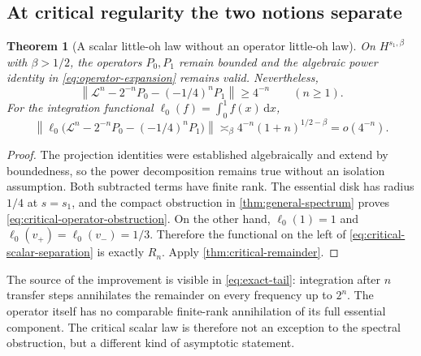 \documentclass[11pt,a4paper]{article}
\newtheorem{theorem}{Theorem}[section]
\theoremstyle{definition}
\theoremstyle{remark}
\newcommand{\dd}{\,\mathrm d}
\newcommand{\Lop}{\mathcal L}
\newcommand{\norm}[1]{\left\lVert#1\right\rVert}
\numberwithin{equation}{section}
\begin{document}
\subsection{At critical regularity the two notions separate}
\begin{theorem}[A scalar little-oh law without an operator little-oh law]
\label{thm:critical-separation}
On $H^{s_1,\beta}$ with $\beta>1/2$, the operators $P_0,P_1$ remain
bounded and the algebraic power identity in \eqref{eq:operator-expansion}
remains valid. Nevertheless,
\begin{equation}
 \norm{\Lop^n-2^{-n}P_0-(-1/4)^nP_1}\ge4^{-n}
 \qquad(n\ge1).
 \label{eq:critical-operator-obstruction}
\end{equation}
For the integration functional $\ell_0(f)=\int_0^1f(x)\dd x$,
\begin{equation}
 \norm{\ell_0\bigl(\Lop^n-2^{-n}P_0-(-1/4)^nP_1\bigr)}
 \asymp_\beta4^{-n}(1+n)^{1/2-\beta}=o(4^{-n}).
 \label{eq:critical-scalar-separation}
\end{equation}
\end{theorem}
\begin{proof}
The projection identities were established algebraically and extend by
boundedness, so the power decomposition remains true without an isolation
assumption. Both subtracted terms have finite rank. The essential disk
has radius $1/4$ at $s=s_1$, and the compact obstruction in
\cref{thm:general-spectrum} proves
\eqref{eq:critical-operator-obstruction}. On the other hand,
$\ell_0(1)=1$ and $\ell_0(v_+)=\ell_0(v_-)=1/3$.
Therefore the functional on the left of
\eqref{eq:critical-scalar-separation} is exactly $R_n$.
Apply \cref{thm:critical-remainder}.
\end{proof}

The source of the improvement is visible in \eqref{eq:exact-tail}:
integration after $n$ transfer steps annihilates the remainder on every
frequency up to $2^n$. The operator itself has no comparable finite-rank
annihilation of its full essential component. The critical scalar law is
therefore not an exception to the spectral obstruction, but a different
kind of asymptotic statement.
\end{document}
